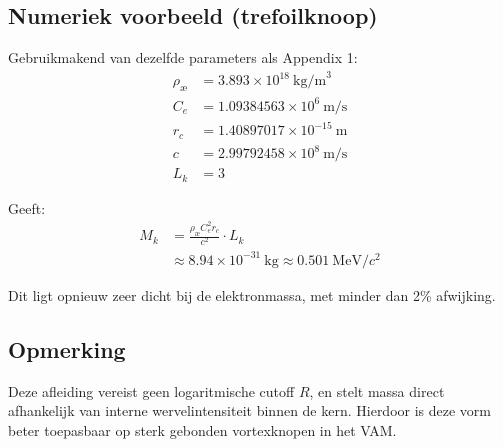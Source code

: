 \subsection*{Numeriek voorbeeld (trefoilknoop)}
Gebruikmakend van dezelfde parameters als Appendix 1:
\begin{align*}
    \rho_\text{\ae} &= 3.893 \times 10^{18}~\text{kg/m}^3 \\
    C_e &= 1.09384563 \times 10^6~\text{m/s} \\
    r_c &= 1.40897017 \times 10^{-15}~\text{m} \\
    c &= 2.99792458 \times 10^8~\text{m/s} \\
    L_k &= 3
\end{align*}

Geeft:
\begin{align*}
    M_k &= \frac{\rho_\text{\ae} C_e^2 r_c}{c^2} \cdot L_k \\
    &\approx 8.94 \times 10^{-31}~\text{kg} \approx 0.501~\text{MeV}/c^2
\end{align*}

Dit ligt opnieuw zeer dicht bij de elektronmassa, met minder dan 2\% afwijking.

\subsection*{Opmerking}
Deze afleiding vereist geen logaritmische cutoff \( R \), en stelt massa direct afhankelijk van interne wervelintensiteit binnen de kern. Hierdoor is deze vorm beter toepasbaar op sterk gebonden vortexknopen in het VAM.